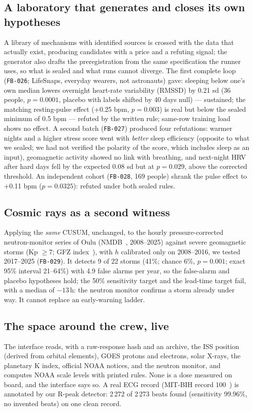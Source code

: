 \documentclass[conference]{IEEEtran}
\newcommand{\act}[1]{\texttt{FB-#1}}
\begin{document}
\subsection{A laboratory that generates and closes its own hypotheses}
A library of mechanisms with identified sources is crossed with the data that actually exist, producing candidates with a price and a refuting signal; the generator also drafts the preregistration from the same specification the runner uses, so what is sealed and what runs cannot diverge. The first complete loop (\act{026}; LifeSnaps, everyday wearers, not astronauts) gave: sleeping below one's own median lowers overnight heart-rate variability (RMSSD) by 0.21 sd (36 people, $p=0.0001$, placebo with labels shifted by 40 days null) --- sustained; the matching resting-pulse effect (+0.25 bpm, $p=0.003$) is real but below the sealed minimum of 0.5 bpm --- refuted by the written rule; same-row training load shows no effect. A second batch (\act{027}) produced four refutations: warmer nights and a higher stress score went with \emph{better} sleep efficiency (opposite to what we sealed; we had not verified the polarity of the score, which includes sleep as an input), geomagnetic activity showed no link with breathing, and next-night HRV after hard days fell by the expected 0.08 sd but at $p=0.029$, above the corrected threshold. An independent cohort (\act{028}, 169 people) shrank the pulse effect to +0.11 bpm ($p=0.0325$): refuted under both sealed rules.

\subsection{Cosmic rays as a second witness}\label{sec:cosmic}
Applying the \emph{same} CUSUM, unchanged, to the hourly pressure-corrected neutron-monitor series of Oulu (NMDB~\cite{nmdb}, 2008--2025) against severe geomagnetic storms (Kp $\geq 7$; GFZ index~\cite{matzka2021}), with $h$ calibrated only on 2008--2016, we tested 2017--2025 (\act{029}). It detects 9 of 22 storms (41\%; chance 6\%, $p=0.001$; exact 95\% interval 21--64\%) with 4.9 false alarms per year, so the false-alarm and placebo hypotheses hold; the 50\% sensitivity target and the lead-time target fail, with a median of $-13$\,h: the neutron monitor confirms a storm already under way. It cannot replace an early-warning ladder.

\subsection{The space around the crew, live}
The interface reads, with a raw-response hash and an archive, the ISS position (derived from orbital elements), GOES protons and electrons, solar X-rays, the planetary K index, official NOAA notices, and the neutron monitor, and computes NOAA scale levels with printed rules. None is a dose measured on board, and the interface says so. A real ECG record (MIT-BIH record 100~\cite{moody2001}) is annotated by our R-peak detector: 2\,272 of 2\,273 beats found (sensitivity 99.96\%, no invented beats) on one clean record.
\end{document}
